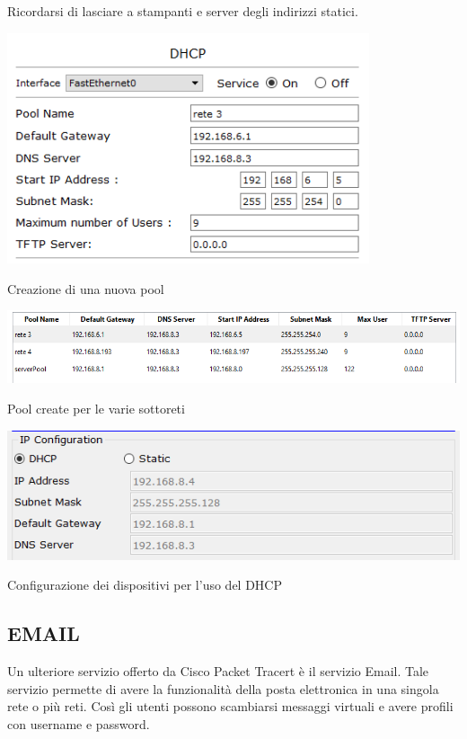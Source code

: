\noindent Ricordarsi di lasciare a stampanti e server degli indirizzi statici.


\begin{sfigure}
    \centering
    \captionsetup{type=figure}
    \includegraphics[width=0.8\textwidth]{images/06.servizi-rete/dhcp/01.conf-pool.png}
    \caption{Creazione di una nuova pool}
    \label{fig:dhcp-conf-pool}
\end{sfigure}

\begin{sfigure}
    \centering
    \captionsetup{type=figure}
    \includegraphics[width=\textwidth]{images/06.servizi-rete/dhcp/02.pools.png}
    \caption{Pool create per le varie sottoreti}
    \label{fig:dhcp-pools}
\end{sfigure}

\begin{sfigure}
    \centering
    \captionsetup{type=figure}
    \includegraphics[width=\textwidth]{images/06.servizi-rete/dhcp/03.conf-pc.png}
    \caption{Configurazione dei dispositivi per l'uso del DHCP}
    \label{fig:dhcp-conf-pc}
\end{sfigure}

\subsection{EMAIL}
Un ulteriore servizio offerto da Cisco Packet Tracert è il servizio Email. Tale servizio permette di avere la funzionalità della posta elettronica in una singola rete o più reti. Così gli utenti possono scambiarsi messaggi virtuali e avere profili con username e password.

